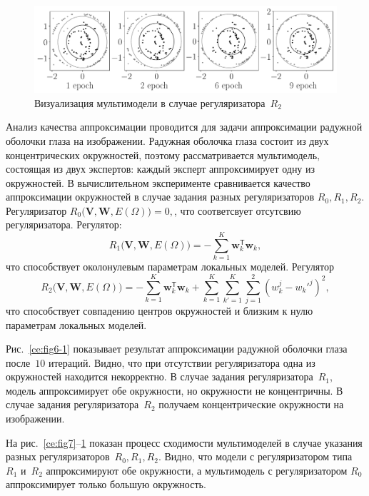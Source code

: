 \documentclass[12pt]{a&t}
\begin{document}
\begin{figure}[h!]
\begin{center}
     \includegraphics[width=\textwidth]{experiment_real_regular}
\end{center}
     \caption{Визуализация мультимодели в случае регуляризатора~$R_2$}
    \label{ce:fig9}
\end{figure}

Анализ качества аппроксимации проводится для задачи аппроксимации радужной оболочки глаза на изображении. Радужная оболочка глаза состоит из двух концентрических окружностей, поэтому рассматривается мультимодель, состоящая из двух экспертов: каждый эксперт аппроксимирует одну из окружностей. В вычислительном эксперименте сравнивается качество аппроксимации окружностей в случае задания разных регуляризаторов $R_0, R_1, R_2$. Регуляризатор $R_0\bigl(\mathbf{V}, \mathbf{W}, E(\Omega)\bigr)=0,$, что соответсвует отсутсвию регуляризатора. Регулятор:
\[
R_1\bigl(\mathbf{V}, \mathbf{W}, E(\Omega)\bigr)= -\sum_{k=1}^{K}\mathbf{w}_k^{\mathsf{T}}\mathbf{w}_k,
\]
что способствует околонулевым параметрам локальных моделей.
Регулятор
\[
R_2\bigl(\mathbf{V}, \mathbf{W}, E(\Omega)\bigr)= -\sum_{k=1}^{K}\mathbf{w}_k^{\mathsf{T}}\mathbf{w}_k + \sum_{k=1}^{K}\sum_{k'=1}^{K}\sum_{j=1}^2\left(w_k^j-w_k'^j\right)^2,\]
что способствует совпадению центров окружностей и близким к нулю параметрам локальных моделей.

Рис.~\ref{ce:fig6-1} показывает результат аппроксимации радужной оболочки глаза после~$10$ итераций. Видно, что при отсутствии регуляризатора одна из окружностей находится некорректно. В случае задания регуляризатора~$R_1$, модель аппроксимирует обе окружности, но окружности не концентричны. В случае задания регуляризатора~$R_2$ получаем концентрические окружности на изображении.

На рис.~\ref{ce:fig7}--\ref{ce:fig9} показан процесс сходимости мультимоделей в случае указания разных регуляризаторов~$R_0, R_1, R_2$. Видно, что модели с регуляризатором типа~$R_1$ и~$R_2$ аппроксимируют обе окружности, а мультимодель с регуляризатором $R_0$ аппроксимирует только большую окружность.
\end{document}
